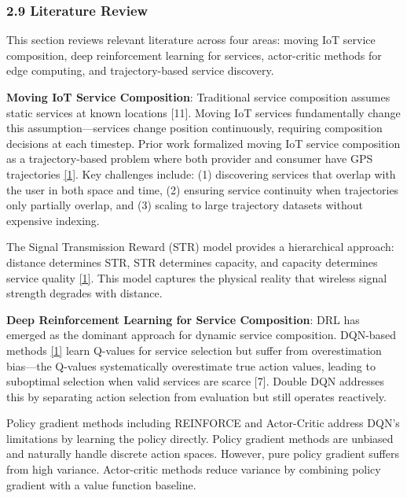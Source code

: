 \hypertarget{literature-review}{%
	\subsubsection{2.9 Literature Review}\label{literature-review}}

This section reviews relevant literature across four areas: moving IoT
service composition, deep reinforcement learning for services,
actor-critic methods for edge computing, and trajectory-based service
discovery.

\textbf{Moving IoT Service Composition}: Traditional service composition
assumes static services at known locations {[}11{]}. Moving IoT services
fundamentally change this assumption---services change position
continuously, requiring composition decisions at each timestep. Prior
work formalized moving IoT service composition as a trajectory-based
problem where both provider and consumer have GPS trajectories \hyperlink{cite.neiat2021}{\hyperlink{cite.neiat2021}{[1]}}.
Key challenges include: (1) discovering services that overlap with the
user in both space and time, (2) ensuring service continuity when
trajectories only partially overlap, and (3) scaling to large trajectory
datasets without expensive indexing.

The Signal Transmission Reward (STR) model provides a hierarchical
approach: distance determines STR, STR determines capacity, and capacity
determines service quality \hyperlink{cite.neiat2021}{\hyperlink{cite.neiat2021}{[1]}}. This model captures the physical
reality that wireless signal strength degrades with distance.

\textbf{Deep Reinforcement Learning for Service Composition}: DRL has
emerged as the dominant approach for dynamic service composition.
DQN-based methods \hyperlink{cite.neiat2021}{\hyperlink{cite.neiat2021}{[1]}} learn Q-values for service selection but
suffer from overestimation bias---the Q-values systematically
overestimate true action values, leading to suboptimal selection when
valid services are scarce {[}7{]}. Double DQN addresses this by
separating action selection from evaluation but still operates
reactively.

Policy gradient methods including REINFORCE and Actor-Critic address
DQN's limitations by learning the policy directly. Policy gradient
methods are unbiased and naturally handle discrete action spaces.
However, pure policy gradient suffers from high variance. Actor-critic
methods reduce variance by combining policy gradient with a value
function baseline.

